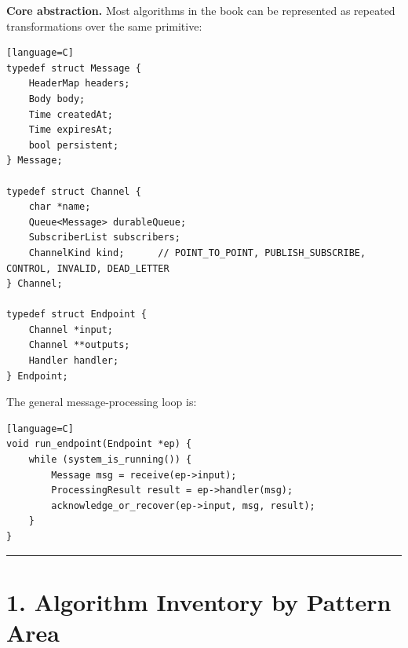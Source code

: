 \documentclass[11pt]{article}
\begin{document}
\textbf{Core abstraction.} Most algorithms in the book can be
represented as repeated transformations over the same primitive:

\begin{verbatim}[language=C]
typedef struct Message {
    HeaderMap headers;
    Body body;
    Time createdAt;
    Time expiresAt;
    bool persistent;
} Message;

typedef struct Channel {
    char *name;
    Queue<Message> durableQueue;
    SubscriberList subscribers;
    ChannelKind kind;      // POINT_TO_POINT, PUBLISH_SUBSCRIBE, CONTROL, INVALID, DEAD_LETTER
} Channel;

typedef struct Endpoint {
    Channel *input;
    Channel **outputs;
    Handler handler;
} Endpoint;
\end{verbatim}

The general message-processing loop is:

\begin{verbatim}[language=C]
void run_endpoint(Endpoint *ep) {
    while (system_is_running()) {
        Message msg = receive(ep->input);
        ProcessingResult result = ep->handler(msg);
        acknowledge_or_recover(ep->input, msg, result);
    }
}
\end{verbatim}

\begin{center}\rule{0.5\linewidth}{0.5pt}\end{center}

\section{1. Algorithm Inventory by Pattern
Area}\label{algorithm-inventory-by-pattern-area}
\end{document}
